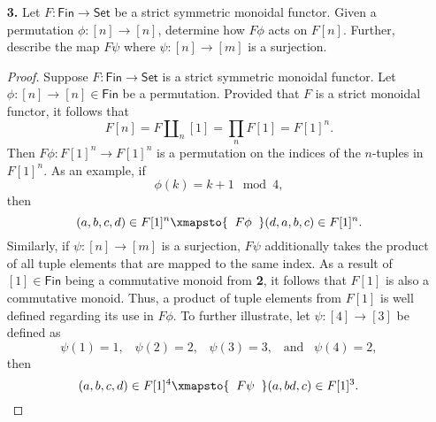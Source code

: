\documentclass[ 12pt ]{article}
\begin{document}
\begin{enumerate}
	\item[\textbf{3.}] Let $F : \mathsf{Fin} \to \mathsf{Set}$ be a strict symmetric monoidal functor. Given a permutation $\phi : [n] \to [n]$, determine how $F \phi$ acts on $F [n]$. Further, describe the map $F \psi$ where $\psi : [n] \to [m]$ is a surjection.

		\begin{proof}
			Suppose $F : \mathsf{Fin} \to \mathsf{Set}$ is a strict symmetric monoidal functor. Let $\phi : [n] \to [n] \in \mathsf{Fin}$ be a permutation. Provided that $F$ is a strict monoidal functor, it follows that $$F [n] = F \amalg_n [1] = \prod_n F[1] = F [1]^n.$$ Then $F \phi : F[1]^n \to F[1]^n$ is a permutation on the indices of the $n$-tuples in $F[1]^n$. As an example, if $$\phi(k) = k + 1 \mod 4,$$ then $$(a, b, c, d) \in F[1]^n \xmapsto{\;\;F \phi\;\;} (d, a, b, c) \in F[1]^n.$$ Similarly, if $\psi : [n] \to [m]$ is a surjection, $F \psi$ additionally takes the product of all tuple elements that are mapped to the same index. As a result of $[1] \in \mathsf{Fin}$ being a commutative monoid from \textbf{2}, it follows that $F[1]$ is also a commutative monoid. Thus, a product of tuple elements from $F[1]$ is well defined regarding its use in $F \phi$. To further illustrate, let $\psi : [4] \to [3]$ be defined as $$\psi(1) = 1,\;\;\; \psi(2) = 2,\;\;\; \psi(3) = 3,\;\;\; \mathrm{and}\;\;\; \psi(4) = 2,$$ then $$(a, b, c, d) \in F[1]^4 \xmapsto{\;\;F \psi\;\;} (a, bd, c) \in F[1]^3.$$
		\end{proof}

\end{enumerate}
\end{document}
